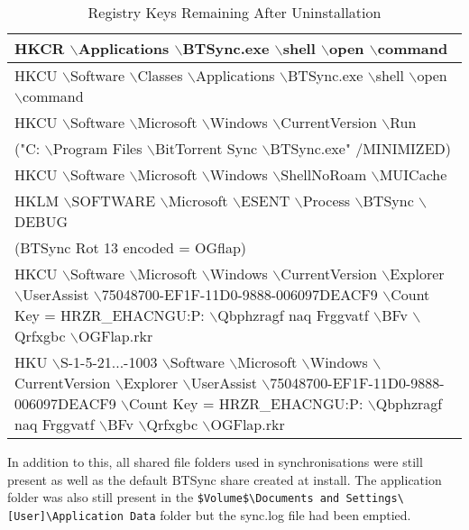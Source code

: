 \documentclass[final,5p,times,twocolumn]{elsarticle}
\begin{document}
\begin{table}[h]
\begin{tabular}{|>{\raggedright\arraybackslash}p{8.5cm}|}
\hline
HKCR $\backslash$Applications $\backslash$BTSync.exe $\backslash$shell $\backslash$open $\backslash$command
\\ \hline
HKCU $\backslash$Software $\backslash$Classes $\backslash$Applications $\backslash$BTSync.exe $\backslash$shell $\backslash$open $\backslash$command
\\ \hline
HKCU $\backslash$Software $\backslash$Microsoft $\backslash$Windows $\backslash$CurrentVersion $\backslash$Run
\\ \hline
("C: $\backslash$Program Files $\backslash$BitTorrent Sync $\backslash$BTSync.exe" /MINIMIZED)
\\ \hline
HKCU $\backslash$Software $\backslash$Microsoft $\backslash$Windows $\backslash$ShellNoRoam $\backslash$MUICache
\\ \hline
HKLM $\backslash$SOFTWARE $\backslash$Microsoft $\backslash$ESENT $\backslash$Process $\backslash$BTSync $\backslash$DEBUG 
\\ \hline
(BTSync Rot 13 encoded = OGflap)
\\ \hline
HKCU $\backslash$Software $\backslash$Microsoft $\backslash$Windows $\backslash$CurrentVersion $\backslash$Explorer $\backslash$UserAssist $\backslash${75048700-EF1F-11D0-9888-006097DEACF9} $\backslash$Count      Key =  HRZR\_EHACNGU:P: $\backslash$Qbphzragf naq Frggvatf $\backslash$BFv $\backslash$Qrfxgbc $\backslash$OGFlap.rkr
\\ \hline
HKU $\backslash$S-1-5-21...-1003 $\backslash$Software $\backslash$Microsoft $\backslash$Windows $\backslash$CurrentVersion $\backslash$Explorer $\backslash$UserAssist $\backslash${75048700-EF1F-11D0-9888-006097DEACF9} $\backslash$Count      Key =  HRZR\_EHACNGU:P: $\backslash$Qbphzragf naq Frggvatf $\backslash$BFv $\backslash$Qrfxgbc $\backslash$OGFlap.rkr
\\ \hline
    \end{tabular}
    \caption {Registry Keys Remaining After Uninstallation}
\label{tab:regkeysafteruninstall}
\end{table}

In addition to this, all shared file folders used in synchronisations were still present as well as the default BTSync share created at install. The application folder was also still present in the \texttt{\$Volume\$\textbackslash Documents and Settings\textbackslash [User]\textbackslash Application Data} folder but the sync.log file had been emptied.
\end{document}
